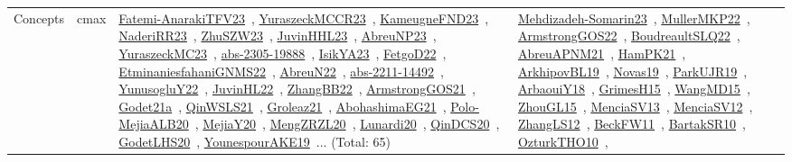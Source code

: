 {\begin{longtable}{lp{3cm}>{\raggedright\arraybackslash}p{6cm}>{\raggedright\arraybackslash}p{6cm}>{\raggedright\arraybackslash}p{8cm}}
Concepts & cmax & \href{../works/Fatemi-AnarakiTFV23.pdf}{Fatemi-AnarakiTFV23}~\cite{Fatemi-AnarakiTFV23}, \href{../works/YuraszeckMCCR23.pdf}{YuraszeckMCCR23}~\cite{YuraszeckMCCR23}, \href{../works/KameugneFND23.pdf}{KameugneFND23}~\cite{KameugneFND23}, \href{../works/NaderiRR23.pdf}{NaderiRR23}~\cite{NaderiRR23}, \href{../works/ZhuSZW23.pdf}{ZhuSZW23}~\cite{ZhuSZW23}, \href{../works/JuvinHHL23.pdf}{JuvinHHL23}~\cite{JuvinHHL23}, \href{../works/AbreuNP23.pdf}{AbreuNP23}~\cite{AbreuNP23}, \href{../works/YuraszeckMC23.pdf}{YuraszeckMC23}~\cite{YuraszeckMC23}, \href{../works/abs-2305-19888.pdf}{abs-2305-19888}~\cite{abs-2305-19888}, \href{../works/IsikYA23.pdf}{IsikYA23}~\cite{IsikYA23}, \href{../works/FetgoD22.pdf}{FetgoD22}~\cite{FetgoD22}, \href{../works/EtminaniesfahaniGNMS22.pdf}{EtminaniesfahaniGNMS22}~\cite{EtminaniesfahaniGNMS22}, \href{../works/AbreuN22.pdf}{AbreuN22}~\cite{AbreuN22}, \href{../works/abs-2211-14492.pdf}{abs-2211-14492}~\cite{abs-2211-14492}, \href{../works/YunusogluY22.pdf}{YunusogluY22}~\cite{YunusogluY22}, \href{../works/JuvinHL22.pdf}{JuvinHL22}~\cite{JuvinHL22}, \href{../works/ZhangBB22.pdf}{ZhangBB22}~\cite{ZhangBB22}, \href{../works/ArmstrongGOS21.pdf}{ArmstrongGOS21}~\cite{ArmstrongGOS21}, \href{../works/Godet21a.pdf}{Godet21a}~\cite{Godet21a}, \href{../works/QinWSLS21.pdf}{QinWSLS21}~\cite{QinWSLS21}, \href{../works/Groleaz21.pdf}{Groleaz21}~\cite{Groleaz21}, \href{../works/AbohashimaEG21.pdf}{AbohashimaEG21}~\cite{AbohashimaEG21}, \href{../works/Polo-MejiaALB20.pdf}{Polo-MejiaALB20}~\cite{Polo-MejiaALB20}, \href{../works/MejiaY20.pdf}{MejiaY20}~\cite{MejiaY20}, \href{../works/MengZRZL20.pdf}{MengZRZL20}~\cite{MengZRZL20}, \href{../works/Lunardi20.pdf}{Lunardi20}~\cite{Lunardi20}, \href{../works/QinDCS20.pdf}{QinDCS20}~\cite{QinDCS20}, \href{../works/GodetLHS20.pdf}{GodetLHS20}~\cite{GodetLHS20}, \href{../works/YounespourAKE19.pdf}{YounespourAKE19}~\cite{YounespourAKE19}... (Total: 65) & \href{../works/Mehdizadeh-Somarin23.pdf}{Mehdizadeh-Somarin23}~\cite{Mehdizadeh-Somarin23}, \href{../works/MullerMKP22.pdf}{MullerMKP22}~\cite{MullerMKP22}, \href{../works/ArmstrongGOS22.pdf}{ArmstrongGOS22}~\cite{ArmstrongGOS22}, \href{../works/BoudreaultSLQ22.pdf}{BoudreaultSLQ22}~\cite{BoudreaultSLQ22}, \href{../works/AbreuAPNM21.pdf}{AbreuAPNM21}~\cite{AbreuAPNM21}, \href{../works/HamPK21.pdf}{HamPK21}~\cite{HamPK21}, \href{../works/ArkhipovBL19.pdf}{ArkhipovBL19}~\cite{ArkhipovBL19}, \href{../works/Novas19.pdf}{Novas19}~\cite{Novas19}, \href{../works/ParkUJR19.pdf}{ParkUJR19}~\cite{ParkUJR19}, \href{../works/ArbaouiY18.pdf}{ArbaouiY18}~\cite{ArbaouiY18}, \href{../works/GrimesH15.pdf}{GrimesH15}~\cite{GrimesH15}, \href{../works/WangMD15.pdf}{WangMD15}~\cite{WangMD15}, \href{../works/ZhouGL15.pdf}{ZhouGL15}~\cite{ZhouGL15}, \href{../works/MenciaSV13.pdf}{MenciaSV13}~\cite{MenciaSV13}, \href{../works/MenciaSV12.pdf}{MenciaSV12}~\cite{MenciaSV12}, \href{../works/ZhangLS12.pdf}{ZhangLS12}~\cite{ZhangLS12}, \href{../works/BeckFW11.pdf}{BeckFW11}~\cite{BeckFW11}, \href{../works/BartakSR10.pdf}{BartakSR10}~\cite{BartakSR10}, \href{../works/OzturkTHO10.pdf}{OzturkTHO10}~\cite{OzturkTHO10}, 
\end{longtable}}
